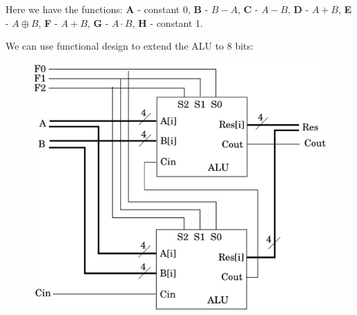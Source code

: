 \documentclass[twocolumn,english]{article}
\begin{document}
\begin{table}[H]
\begin{minipage}[t]{0.25\textwidth}
\noindent \begin{centering}
\par\end{centering}

\noindent \centering{}\end{minipage}
\end{table}


Here we have the functions: \textbf{A} - constant 0, \textbf{B} -
$B-A$, \textbf{C} - $A-B$, \textbf{D} - $A+B$, \textbf{E} - $A\oplus B$,
\textbf{F} - $A+B$, \textbf{G} - $A\cdot B$, \textbf{H} - constant
1.

We can use functional design to extend the ALU to 8 bits:

\begin{figure}[H]
\noindent \centering{}\includegraphics[width=0.2\paperwidth]{img/alu8}
\end{figure}
\end{document}
